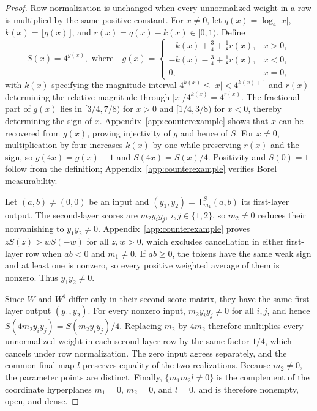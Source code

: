 \documentclass[mlmain]{jmlr}
\newcommand{\T}{\mathsf{T}}
\begin{document}
\begin{proof}
Row normalization is unchanged when every unnormalized weight in a row is
multiplied by the same positive constant.  For $x\ne0$, let
$q(x)=\log_4|x|$, $k(x)=\lfloor q(x)\rfloor$, and
$r(x)=q(x)-k(x)\in[0,1)$.  Define
\begin{equation}
S(x) = 4^{g(x)}, \text{ where}\quad
 g(x)=
 \begin{cases}
  -k(x)+\frac34+\frac18r(x),&x>0,\\
  -k(x)-\frac34+\frac18r(x),&x<0,\\
  0,&x=0,
 \end{cases}
 \label{eq:exotic-normalizer}
\end{equation}
with $k(x)$ specifying the magnitude interval
$4^{k(x)}\le|x|<4^{k(x)+1}$ and $r(x)$ determining the relative magnitude
through $|x|/4^{k(x)}=4^{r(x)}$.  The fractional part of $g(x)$ lies in
$[3/4,7/8)$ for $x>0$ and $[1/4,3/8)$ for $x<0$, thereby determining the
sign of $x$.  Appendix~\ref{app:counterexample} shows that $x$ can be
recovered from $g(x)$, proving injectivity of $g$ and hence of $S$.  For
$x\ne0$, multiplication by four increases $k(x)$ by one while preserving
$r(x)$ and the sign, so $g(4x)=g(x)-1$ and $S(4x)=S(x)/4$.  Positivity and
$S(0)=1$ follow from the definition; Appendix~\ref{app:counterexample}
verifies Borel measurability.

Let $(a,b)\ne(0,0)$ be an input and $(y_1,y_2)=\T_{m_1}^S(a,b)$ its
first-layer output.  The second-layer scores are $m_2y_i y_j$,
$i,j\in\{1,2\}$, so $m_2\ne0$ reduces their nonvanishing to $y_1y_2\ne0$.
Appendix~\ref{app:counterexample} proves $zS(z)>wS(-w)$ for all $z,w>0$,
which excludes cancellation in either first-layer row when $ab<0$ and
$m_1\ne0$.  If $ab\ge0$, the tokens have the same weak sign and at least
one is nonzero, so every positive weighted average of them is nonzero.
Thus $y_1y_2\ne0$.

Since $W$ and $W^\sharp$ differ only in their second score matrix, they have
the same first-layer output $(y_1,y_2)$.  For every nonzero input,
$m_2y_i y_j\ne0$ for all $i,j$, and hence
$S(4m_2y_i y_j)=S(m_2y_i y_j)/4$.  Replacing $m_2$ by $4m_2$ therefore
multiplies every unnormalized weight in each second-layer row by the same
factor $1/4$, which cancels under row normalization.  The zero input agrees
separately, and the common final map $l$ preserves equality of the two
realizations.  Because $m_2\ne0$, the parameter points are distinct.  Finally,
$\{m_1m_2l\ne0\}$ is the complement of the coordinate hyperplanes $m_1=0$,
$m_2=0$, and $l=0$, and is therefore nonempty, open, and dense.
\end{proof}
\end{document}
